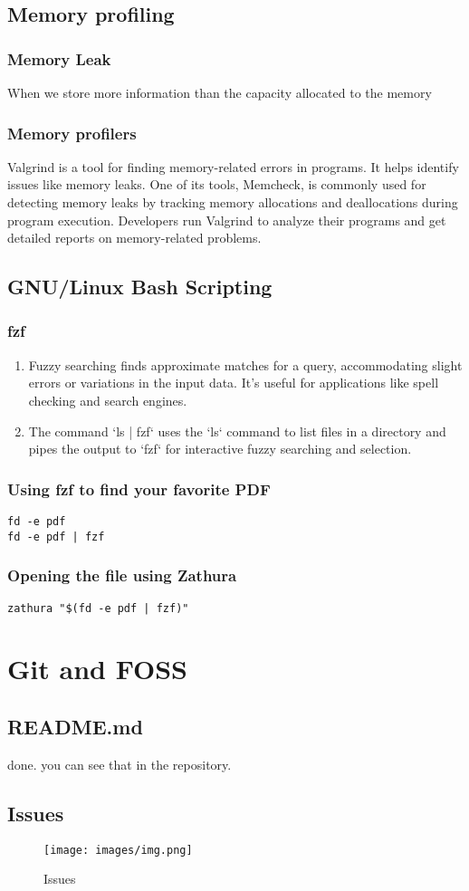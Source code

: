 \documentclass[titlepage]{article}
\begin{document}
\subsection{Memory profiling}

\subsubsection{Memory Leak}
When we store more information than the capacity allocated to the memory
\subsubsection{Memory profilers}
Valgrind is a tool for finding memory-related errors in programs. It helps identify issues like memory leaks. One of its tools, Memcheck, is commonly used for detecting memory leaks by tracking memory allocations and deallocations during program execution. Developers run Valgrind to analyze their programs and get detailed reports on memory-related problems.
\newpage
\subsection{GNU/Linux Bash Scripting}
\subsubsection{fzf}
\begin{enumerate}
    \item Fuzzy searching finds approximate matches for a query, accommodating slight errors or variations in the input data. It's useful for applications like spell checking and search engines.

    \item The command `ls | fzf` uses the `ls` command to list files in a directory and pipes the output to `fzf` for interactive fuzzy searching and selection.
\end{enumerate}
\subsubsection{Using fzf to find your favorite PDF}
\begin{verbatim}
fd -e pdf
fd -e pdf | fzf
\end{verbatim}
\subsubsection{Opening the file using Zathura}
\begin{verbatim}
zathura "$(fd -e pdf | fzf)"
\end{verbatim}
\section{Git and FOSS}
\subsection{README.md}
done. you can see that in the repository.

\subsection{Issues}
\begin{figure}[h]
    \centering
    \texttt{[image: images/img.png]}
    \caption{Issues}
\end{figure}
\end{document}
